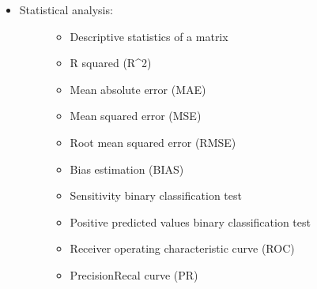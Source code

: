 \documentclass[letterpaper,10pt,english]{sphinxmanual}
\begin{document}
\begin{itemize}
\begin{description}
\begin{itemize}
\item {} 
\sphinxAtStartPar
Matrix pseudo inversion using the Moore\sphinxhyphen{}Penrose formula

\item {} 
\sphinxAtStartPar
Matrix transpose

\item {} 
\sphinxAtStartPar
Tensor/Tensor dot product

\item {} 
\sphinxAtStartPar
Vector/Matrix Kronecker product

\item {} 
\sphinxAtStartPar
Tensor/Matrix dot product

\item {} 
\sphinxAtStartPar
Tensor transpose

\end{itemize}

\end{description}

\item {} \begin{description}
\item[{Statistical analysis:}] \leavevmode\begin{itemize}
\item {} 
\sphinxAtStartPar
Descriptive statistics of a matrix

\item {} 
\sphinxAtStartPar
R squared (R\textasciicircum{}2)

\item {} 
\sphinxAtStartPar
Mean absolute error (MAE)

\item {} 
\sphinxAtStartPar
Mean squared error (MSE)

\item {} 
\sphinxAtStartPar
Root mean squared error (RMSE)

\item {} 
\sphinxAtStartPar
Bias estimation (BIAS)

\item {} 
\sphinxAtStartPar
Sensitivity binary classification test

\item {} 
\sphinxAtStartPar
Positive predicted values binary classification test

\item {} 
\sphinxAtStartPar
Receiver operating characteristic curve (ROC)

\item {} 
\sphinxAtStartPar
Precision\sphinxhyphen{}Recal curve (PR)


\end{itemize}
\end{description}
\end{itemize}
\end{document}
